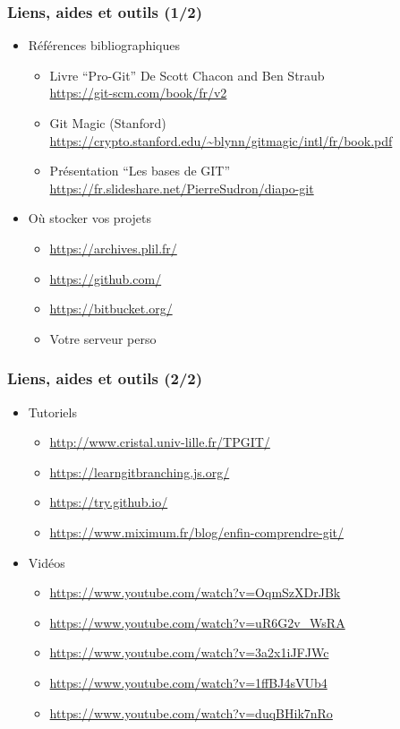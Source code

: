 \documentclass[table,tikz,12pt,svgnames]{beamer}
\begin{document}

\begin{frame}
\frametitle{Liens, aides et outils (1/2)}
\begin{itemize}
	\item Références bibliographiques
	\begin{itemize}
		\item Livre ``Pro-Git'' De Scott Chacon and Ben Straub\\
		\url{https://git-scm.com/book/fr/v2}
		\item Git Magic (Stanford)\\
		\url{https://crypto.stanford.edu/~blynn/gitmagic/intl/fr/book.pdf}
		\item Présentation ``Les bases de GIT''
		\url{https://fr.slideshare.net/PierreSudron/diapo-git}

	\end{itemize}
	\vspace{1em}

	\item Où stocker vos projets
	\begin{itemize}
		\item \url{https://archives.plil.fr/}
		\item \url{https://github.com/}
		\item \url{https://bitbucket.org/}
		\item Votre serveur perso
	\end{itemize}
\end{itemize}
\end{frame}

\begin{frame}
\frametitle{Liens, aides et outils (2/2)}
\begin{itemize}
	\item Tutoriels
	\begin{itemize}
		\item \url{http://www.cristal.univ-lille.fr/TPGIT/}
		\item \url{https://learngitbranching.js.org/}
		\item \url{https://try.github.io/}
		\item \url{https://www.miximum.fr/blog/enfin-comprendre-git/}
	\end{itemize}
	\item Vidéos
	\begin{itemize}
		\item \url{https://www.youtube.com/watch?v=OqmSzXDrJBk}
		\item \url{https://www.youtube.com/watch?v=uR6G2v_WsRA}
		\item \url{https://www.youtube.com/watch?v=3a2x1iJFJWc}
		\item \url{https://www.youtube.com/watch?v=1ffBJ4sVUb4}
		\item \url{https://www.youtube.com/watch?v=duqBHik7nRo}
	\end{itemize}
\end{itemize}
\end{frame}


\end{document}
